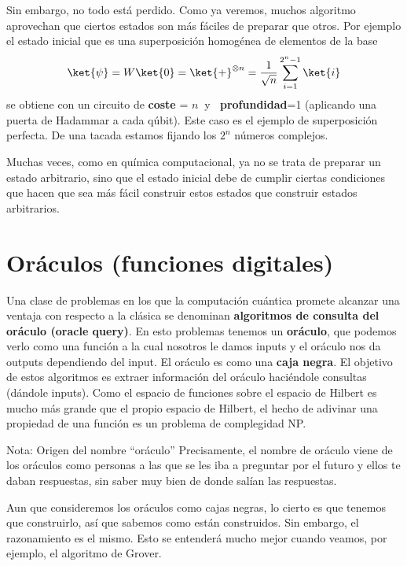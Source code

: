 \documentclass[a4paper,11pt]{book} %
\numberwithin{equation}{chapter}
\begin{document}
Sin embargo, no todo está perdido. Como ya veremos, muchos algoritmo aprovechan que ciertos estados son más fáciles de preparar que otros.  Por ejemplo el estado inicial que es una superposición homogénea de elementos de la base
\begin{equation}
\ket{\psi} = W \ket{0}  = \ket{+}^{\otimes n}= \frac{1}{\sqrt{n}}\sum_{i=1}^{2^n-1} \ket{i}
\end{equation}
se obtiene con un circuito de  \textbf{coste} = $n~$  y $~$ \textbf{profundidad}=1 (aplicando una puerta de Hadammar a cada qúbit). Este caso es el ejemplo de superposición perfecta. De una tacada estamos fijando los $2^n$ números complejos.

Muchas veces, como en química computacional, ya no se trata de preparar un estado arbitrario, sino que el estado inicial debe de cumplir ciertas condiciones que hacen que sea más fácil construir estos estados que construir estados arbitrarios.

    
    
    \section{Oráculos (funciones digitales)}

Una clase de problemas en los que la computación cuántica promete alcanzar una ventaja con respecto a la clásica se denominan \textbf{algoritmos de consulta del oráculo (oracle query)}. En esto problemas tenemos un \textbf{oráculo}, que podemos verlo como una función a la cual nosotros le damos inputs y el oráculo nos da outputs dependiendo del input. El oráculo es como una \textbf{caja negra}. El objetivo de estos algoritmos es extraer información del oráculo haciéndole consultas (dándole inputs). Como el espacio de funciones sobre el espacio de Hilbert es mucho más grande que el propio espacio de Hilbert, el hecho de adivinar una propiedad de una función es un problema de complegidad NP.

	\begin{mybox_blue}{Nota: Origen del nombre ``oráculo''}
	Precisamente, el nombre de oráculo viene de los oráculos como personas a las que se les iba a preguntar
	por el futuro y ellos te daban respuestas, sin saber muy bien de donde salían las respuestas.
	\end{mybox_blue}

Aun que consideremos los oráculos como cajas negras, lo cierto es que tenemos que construirlo, así que sabemos como están construidos. Sin embargo, el razonamiento es el mismo. Esto se entenderá mucho mejor cuando veamos, por ejemplo, el algoritmo de Grover.
\end{document}
